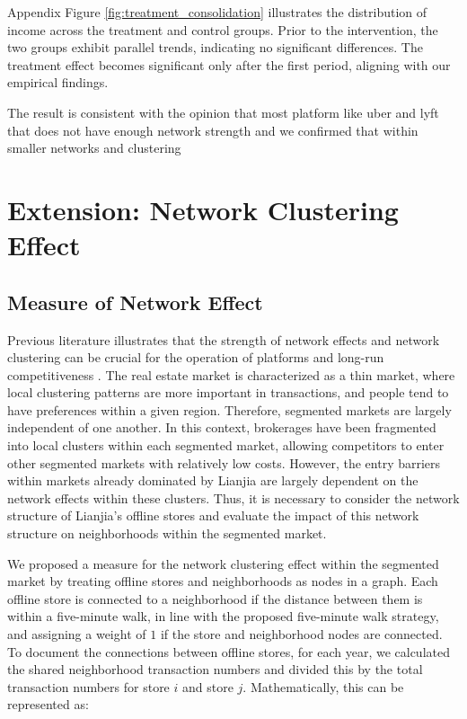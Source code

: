 \documentclass[11pt]{article}
\begin{document}
Appendix Figure \ref{fig:treatment_consolidation} illustrates the distribution of income across the treatment and control groups. Prior to the intervention, the two groups exhibit parallel trends, indicating no significant differences. The treatment effect becomes significant only after the first period, aligning with our empirical findings.


















The result is consistent with the opinion that most platform like uber and lyft that does not have enough network strength and we confirmed that within smaller networks and clustering  \citep{10.1257/jep.28.2.3}

\section{Extension: Network Clustering Effect} \label{sec:network_effect}

\subsection{Measure of Network Effect} \label{subsec:measure_network_effect}

Previous literature illustrates that the strength of network effects and network clustering can be crucial for the operation of platforms and long-run competitiveness \citep{WOS:000454186600016}. The real estate market is characterized as a thin market, where local clustering patterns are more important in transactions, and people tend to have preferences within a given region. Therefore, segmented markets are largely independent of one another. In this context, brokerages have been fragmented into local clusters within each segmented market, allowing competitors to enter other segmented markets with relatively low costs. However, the entry barriers within markets already dominated by Lianjia are largely dependent on the network effects within these clusters. Thus, it is necessary to consider the network structure of Lianjia's offline stores and evaluate the impact of this network structure on neighborhoods within the segmented market.

We proposed a measure for the network clustering effect within the segmented market by treating offline stores and neighborhoods as nodes in a graph. Each offline store is connected to a neighborhood if the distance between them is within a five-minute walk, in line with the proposed five-minute walk strategy, and assigning a weight of $1$ if the store and neighborhood nodes are connected. To document the connections between offline stores, for each year, we calculated the shared neighborhood transaction numbers and divided this by the total transaction numbers for store $i$ and store $j$. Mathematically, this can be represented as:
\end{document}
